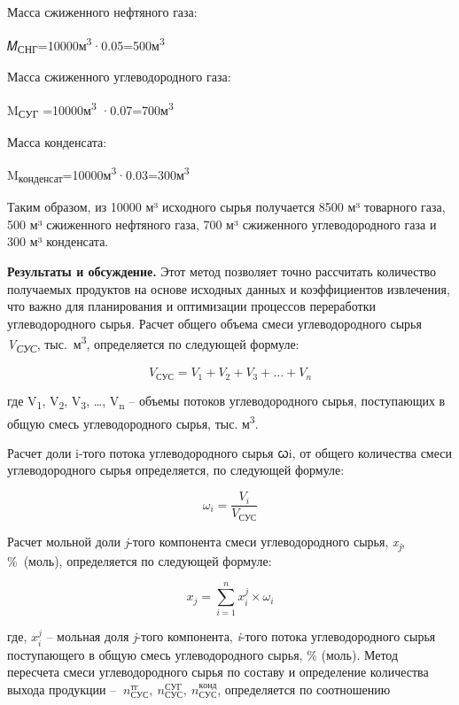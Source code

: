 \begin{multicols}{2}
{Масса сжиженного нефтяного газа:

𝑀\textsubscript{СНГ}=10000м\textsuperscript{3}·0.05=500м\textsuperscript{3}

Масса сжиженного углеводородного газа:

M\textsubscript{СУГ} =10000м\textsuperscript{3}
·0.07=700м\textsuperscript{3}

Масса конденсата:

M\textsubscript{конденсат}=10000м\textsuperscript{3}·0.03=300м\textsuperscript{3}}

Таким образом, из 10000 м³ исходного сырья получается 8500 м³ товарного
газа, 500 м³ сжиженного нефтяного газа, 700 м³ сжиженного
углеводородного газа и 300 м³ конденсата.

{\bfseries Результаты и обсуждение.} Этот метод позволяет точно рассчитать
количество получаемых продуктов на основе исходных данных и
коэффициентов извлечения, что важно для планирования и оптимизации
процессов переработки углеводородного сырья. Расчет общего объема смеси
углеводородного сырья \emph{V\textsubscript{СУС}},
тыс.~м\textsuperscript{3}, определяется по следующей формуле:

\begin{equation}
V_{\text{СУС}} = V_{1} + V_{2} + V_{3} + \ldots + V_{n}
\end{equation}

где V\textsubscript{1}, V\textsubscript{2}, V\textsubscript{3}, \ldots,
V\textsubscript{n} -- объемы потоков углеводородного сырья, поступающих
в общую смесь углеводородного сырья, тыс. м\textsuperscript{3}.

Расчет доли i-того потока углеводородного сырья ꞷi, от общего количества
смеси углеводородного сырья определяется, по следующей формуле:

\begin{equation}
\omega_{i} = \frac{V_{i}}{V_{\text{СУС}}}
\end{equation}

Расчет мольной доли \emph{j}-того компонента смеси углеводородного
сырья, \emph{x\textsubscript{j}}, \%~(моль), определяется по следующей
формуле:

\begin{equation}
x_{j} = \sum_{i = 1}^{n}{x_{i}^{j} \times \omega_{i}}
\end{equation}

где, \(x_{i}^{j}\) -- мольная доля \emph{j}-того компонента,
\emph{i}-того потока углеводородного сырья поступающего в общую смесь
углеводородного сырья, \% (моль). Метод пересчета смеси углеводородного
сырья по составу и определение количества выхода продукции --
\({\ n}_{СУС}^{тг},{\ n}_{СУС}^{СУГ},{\ n}_{СУС}^{конд}\), определяется
по соотношению
\end{multicols}

